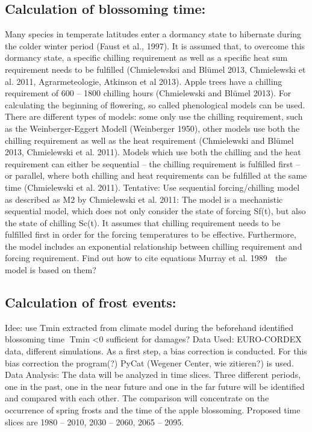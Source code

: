 \subsection{{Calculation of blossoming time:  } }
Many species in temperate latitudes enter a dormancy state to hibernate during the colder winter period (Faust et al., 1997). It is assumed that, to overcome this dormancy state, a specific chilling requirement as well as a specific heat sum requirement needs to be fulfilled (Chmielewsksi and Blümel 2013, Chmielewski et al. 2011, Agrarmeteologie, Atkinson et al 2013). Apple trees have a chilling requirement of 600 – 1800 chilling hours (Chmielewski and Blümel 2013). For calculating the beginning of flowering, so called phenological models can be used. There are different types of models: some only use the chilling requirement, such as the Weinberger-Eggert Modell (Weinberger 1950), other models use both the chilling requirement as well as the heat requirement (Chmielewski and Blümel 2013, Chmielewski et al. 2011). Models which use both the chilling and the heat requirement can either be sequential – the chilling requirement is fulfilled first – or parallel, where both chilling and heat requirements can be fulfilled at the same time (Chmielewski et al. 2011). 
Tentative: Use sequential forcing/chilling model as described as M2 by Chmielewski et al. 2011:
The model is a mechanistic sequential model, which does not only consider the state of forcing Sf(t), but also the state of chilling Sc(t). It assumes that chilling requirement needs to be fulfilled first in order for the forcing temperatures to be effective. Furthermore, the model includes an exponential relationship between chilling requirement and forcing requirement. 
Find out how to cite equations
Murray et al. 1989  the model is based on them? \\


\subsection{{Calculation of frost events: } }
Idee: use Tmin extracted from climate model during the beforehand identified blossoming time Tmin <0 sufficient for damages?
Data Used:
EURO-CORDEX data, different simulations.
As a first step, a bias correction is conducted. For this bias correction the program(?) PyCat (Wegener Center, wie zitieren?) is used. 
Data Analysis:
The data will be analyzed in time slices. Three different periods, one in the past, one in the near future and one in the far future will be identified and compared with each other. The comparison will concentrate on the occurrence of spring frosts and the time of the apple blossoming. Proposed time slices are 1980 – 2010, 2030 – 2060, 2065 – 2095. \\

